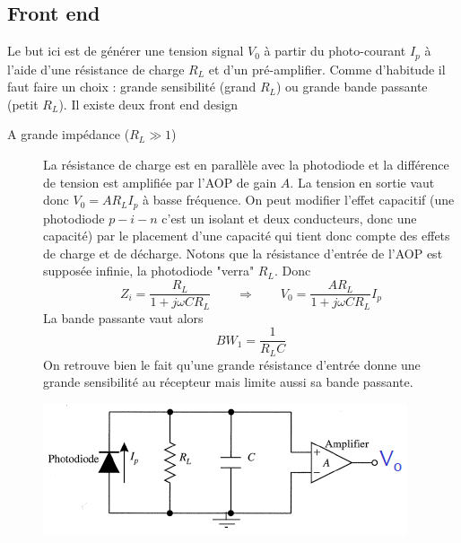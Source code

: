 \subsection{Front end}
Le but ici est de générer une tension signal $V_0$ à partir du photo-courant $I_p$ à l'aide d'une
résistance de charge $R_L$ et d'un pré-amplifier. Comme d'habitude il faut faire un choix : 
grande sensibilité (grand $R_L$) ou grande bande passante (petit $R_L$). Il existe deux front end
design
\begin{description}
\item[A grande impédance ($R_L\gg1$)] La résistance de charge est en parallèle avec la photodiode et
la différence de tension est amplifiée par l'AOP de gain $A$. La tension en sortie vaut donc 
$V_0=AR_LI_p$ à basse fréquence. On peut modifier l'effet capacitif (une photodiode $p-i-n$ c'est
un isolant et deux conducteurs, donc une capacité) par le placement d'une capacité qui tient donc 
compte des effets de charge et de décharge. Notons que la résistance d'entrée de l'AOP est supposée
infinie, la photodiode "verra" $R_L$. Donc
\begin{equation}
Z_i = \dfrac{R_L}{1+j\omega CR_L}\qquad\Rightarrow\qquad {V_0} = \frac{{A{R_L}}}{{1 + j\omega C{R_L}}}{I_p}
\end{equation}
La bande passante vaut alors
\begin{equation}
BW_1 = \dfrac{1}{R_LC}
\end{equation}
On retrouve bien le fait qu'une grande résistance d'entrée donne une grande sensibilité au récepteur
mais limite aussi sa bande passante.
\begin{center}
\includegraphics[scale=0.5]{ch5/image9}
\end{center}


\end{description}

